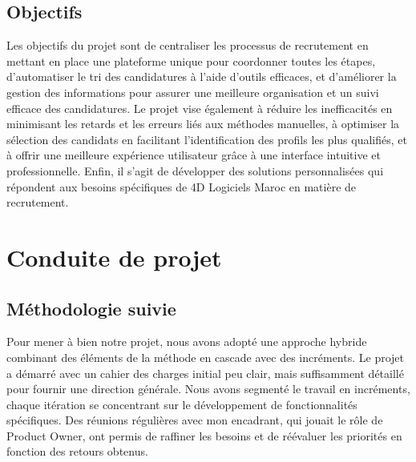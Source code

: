 \subsection{Objectifs}



Les objectifs du projet sont de centraliser les processus de recrutement en mettant en place une plateforme unique pour coordonner toutes les étapes, 
d'automatiser le tri des candidatures à l'aide d'outils efficaces, 
et d'améliorer la gestion des informations pour assurer une 
meilleure organisation et un suivi efficace des candidatures. 
Le projet vise également à réduire les inefficacités en minimisant 
les retards et les erreurs liés aux méthodes manuelles, 
à optimiser la sélection des candidats en facilitant 
l'identification des profils les plus qualifiés, et à offrir une 
meilleure expérience utilisateur grâce à une interface intuitive 
et professionnelle. Enfin, il s'agit de développer des solutions 
personnalisées qui répondent aux besoins spécifiques de 4D 
Logiciels Maroc en matière de recrutement.

\section{Conduite de projet}
\subsection{Méthodologie suivie}
Pour mener à bien notre projet, nous avons adopté une approche hybride 
combinant des éléments de la méthode en cascade avec des incréments. 
Le projet a démarré avec un cahier des charges initial peu clair, 
mais suffisamment détaillé pour fournir une direction générale. 
Nous avons segmenté le travail en incréments, chaque itération se 
concentrant sur le développement de fonctionnalités spécifiques. 
Des réunions régulières avec mon encadrant, qui jouait le rôle de 
Product Owner, ont permis de raffiner les besoins et de réévaluer 
les priorités en fonction des retours obtenus.

